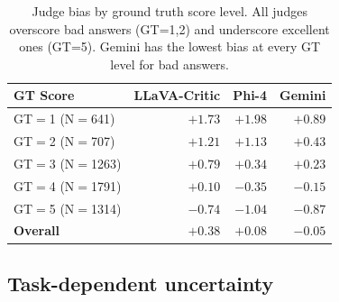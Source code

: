 \documentclass{article}
\begin{document}
\begin{table}[t]
\centering
\caption{Judge bias by ground truth score level. All judges overscore bad answers (GT=1,2) and underscore excellent ones (GT=5). Gemini has the lowest bias at every GT level for bad answers.}
\label{tab:bias}
\small
\begin{tabular}{lrrr}
\toprule
\textbf{GT Score} & \textbf{LLaVA-Critic} & \textbf{Phi-4} & \textbf{Gemini} \\
\midrule
GT$=$1 (N$=$641) & $+1.73$ & $+1.98$ & $\mathbf{+0.89}$ \\
GT$=$2 (N$=$707) & $+1.21$ & $+1.13$ & $\mathbf{+0.43}$ \\
GT$=$3 (N$=$1263) & $+0.79$ & $+0.34$ & $\mathbf{+0.23}$ \\
GT$=$4 (N$=$1791) & $+0.10$ & $-0.35$ & $\mathbf{-0.15}$ \\
GT$=$5 (N$=$1314) & $-0.74$ & $-1.04$ & $\mathbf{-0.87}$ \\
\midrule
\textbf{Overall} & $+0.38$ & $+0.08$ & $\mathbf{-0.05}$ \\
\bottomrule
\end{tabular}
\end{table}

\subsection{Task-dependent uncertainty}
\label{sec:task_dependent}
\end{document}
